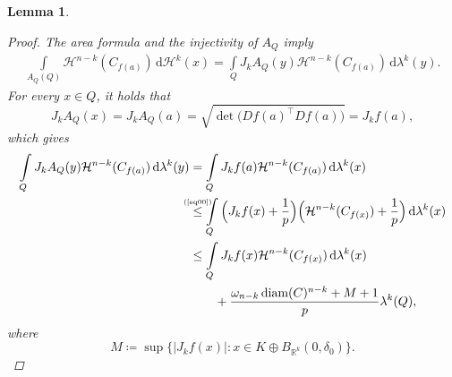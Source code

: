 \documentclass[pdflatex,sn-mathphys-num]{sn-jnl}
\theoremstyle{plain}
\newtheorem{lemma}[theorem]{Lemma}
\theoremstyle{definition}
\DeclareMathOperator{\diam}{\textup{diam}}
\newcommand{\dH}[1]{\,\mathrm d\mathcal{H}^{#1}}
\newcommand{\dlambda}[1]{\,\mathrm d\lambda^{#1}}
\begin{document}
\begin{lemma}
\begin{proof}
 The area formula and the injectivity of $A_Q$ imply
 \begin{equation*}
    \begin{split}
        \int\limits_{A_Q(Q)}\mathcal{H}^{n-k}(C_{f(a)})\dH{k}(x)=\int\limits_{Q}J_kA_Q(y)\mathcal{H}^{n-k}(C_{f(a)})\dlambda{k}(y).
        \end{split}
        \end{equation*}
        For every $x\in Q$, it holds that $$J_kA_Q(x)=J_kA_Q(a)=\sqrt{\det\big(Df(a)^{\top}Df(a)\big)}=J_kf(a),$$ which gives \newcommand\myeqhuhuju{\mathrel{\stackrel{\makebox[0pt]{\mbox{\normalfont\tiny (\ref{eq00})}}}{\leq}}}   \begin{equation}\label{Eq2}
    \begin{split}
        \int\limits_{Q}J_kA_Q(y)\mathcal{H}^{n-k}(C_{f(a)})\dlambda{k}(y)&=\int\limits_{Q}J_kf(a)\mathcal{H}^{n-k}(C_{f(a)})\dlambda{k}(x)\\&\myeqhuhuju\int\limits_{Q}\Big(J_kf(x)+\frac{1}{p}\Big)\Big(\mathcal{H}^{n-k}(C_{f(x)})+\frac{1}{p}\Big)\dlambda{k}(x)\\&\leq\int\limits_{Q}J_kf(x)\mathcal{H}^{n-k}(C_{f(x)})\dlambda{k}(x)\\&\quad\quad+\frac{\omega_{n-k}\diam(C)^{n-k}+M+1}{p}\lambda^k(Q), 
        \end{split}
        \end{equation}
where $$M\coloneq\sup\big\{|J_kf(x)| : x\in K\oplus B_{\mathbb{R}^k}(0, \delta_0)\big\}.$$
\medskip
\newcommand\myeqhuh{\mathrel{\stackrel{\makebox[0pt]{\mbox{\normalfont\tiny (\ref{Eq1})}}}{\leq}}}
\newcommand\myeqhu{\mathrel{\stackrel{\makebox[0pt]{\mbox{\normalfont\tiny (\ref{Eq2})}}}{\leq}}}
\newcommand\myeqh{\mathrel{\stackrel{\makebox[0pt]{\mbox{\normalfont\tiny (\ref{Eq4})}}}{\leq}}}



\end{proof}
\end{lemma}
\end{document}
